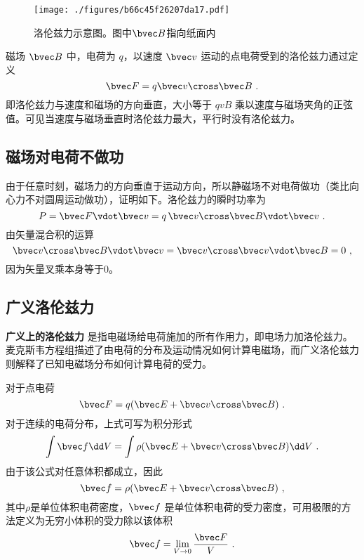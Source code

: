 
\begin{figure}[ht]
\centering
\texttt{[image: ./figures/b66c45f26207da17.pdf]}
\caption{洛伦兹力示意图。图中$\bvec B$指向纸面内} \label{fig_Lorenz_1}
\end{figure}
磁场 $\bvec B$ 中，电荷为 $q$，以速度 $\bvec v$ 运动的点电荷受到的洛伦兹力通过定义
\begin{equation}\label{eq_Lorenz_1}
\bvec F = q\bvec v \cross \bvec B~.
\end{equation}
即洛伦兹力与速度和磁场的方向垂直，大小等于 $qvB$ 乘以速度与磁场夹角的正弦值。可见当速度与磁场垂直时洛伦兹力最大，平行时没有洛伦兹力。

\subsection{磁场对电荷不做功}
由于任意时刻，磁场力的方向垂直于运动方向，所以静磁场不对电荷做功（类比向心力不对圆周运动做功），证明如下。洛伦兹力的瞬时功率为
\begin{equation}
P = \bvec F \vdot \bvec v = q\,\bvec v \cross \bvec B \vdot \bvec v~.
\end{equation}
由矢量混合积的运算
\begin{equation}
\bvec v \cross \bvec B \vdot \bvec v = \bvec v \cross \bvec v \vdot \bvec B = 0~,
\end{equation}
因为矢量叉乘本身等于0。


\subsection{广义洛伦兹力}
\textbf{广义上的洛伦兹力} 是指电磁场给电荷施加的所有作用力，即电场力加洛伦兹力。麦克斯韦方程组描述了由电荷的分布及运动情况如何计算电磁场，而广义洛伦兹力则解释了已知电磁场分布如何计算电荷的受力。

对于点电荷
\begin{equation}\label{eq_Lorenz_2}
\bvec F = q (\bvec E + \bvec v \cross \bvec B)~.
\end{equation}
对于连续的电荷分布，上式可写为积分形式
\begin{equation}
\int \bvec f \dd V= \int \rho(\bvec E + \bvec v \cross \bvec B) \dd V~.
\end{equation}
由于该公式对任意体积都成立，因此
\begin{equation}
\bvec f = \rho(\bvec E + \bvec v \cross \bvec B)~,
\end{equation}
其中$\rho$是单位体积电荷密度，$\bvec f$ 是单位体积电荷的受力密度，可用极限的方法定义为无穷小体积的受力除以该体积
\begin{equation}
\bvec f = \lim_{V \to 0} \frac{\bvec F}{V}~.
\end{equation}

